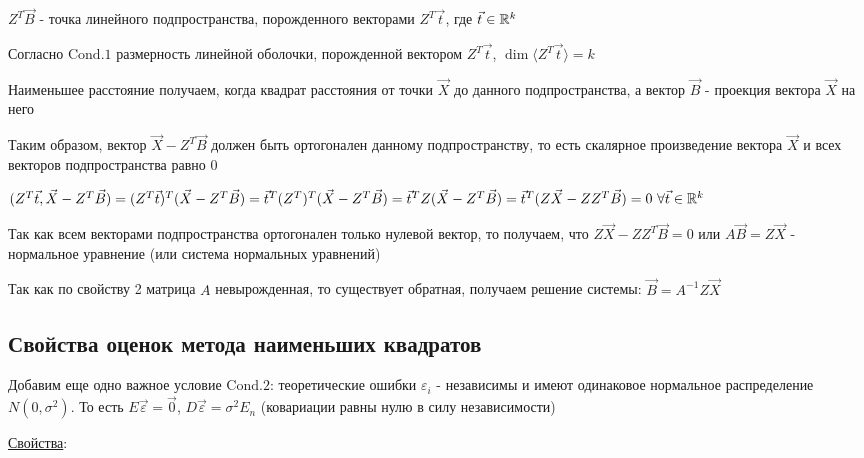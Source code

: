 \documentclass[12pt]{article}
\begin{document}
$Z^T \vec B$ - точка линейного подпространства, порожденного векторами $Z^T \vec t$, где $\vec t \in \mathbb{R}^k$

\Nota Согласно $\mathrm{Cond. 1}$ размерность линейной оболочки, порожденной вектором $Z^T \vec t$,  $\dim \langle Z^T \vec t \rangle = k$

Наименьшее расстояние получаем, когда квадрат расстояния от точки $\vec X$ до данного подпространства, а вектор $\vec B$ - проекция вектора $\vec X$ на него

Таким образом, вектор $\vec X - Z^T \vec B$ должен быть ортогонален данному подпространству, то есть скалярное произведение вектора $\vec X$ и всех векторов подпространства равно 0

$(Z^T \vec t, \vec X - Z^T \vec B) = (Z^T \vec t)^T (\vec X - Z^T \vec B) = {\vec t}^T (Z^T)^T (\vec X - Z^T \vec B) = {\vec t}^T Z (\vec X - Z^T \vec B) = 
{\vec t}^T (Z \vec X - Z Z ^T \vec B) = 0 \ \forall \vec t \in \mathbb{R}^k$

Так как всем векторами подпространства ортогонален только нулевой вектор, то получаем, что $Z \vec X - Z Z^T \vec B = 0$ или $A \vec B = Z \vec X$ - нормальное уравнение (или система нормальных уравнений)

Так как по свойству 2 матрица $A$ невырожденная, то существует обратная, получаем решение системы: $\vec B = A^{-1} Z \vec X$

\subsection{Свойства оценок метода наименьших квадратов}

Добавим еще одно важное условие $\mathrm{Cond. 2}$: теоретические ошибки $\varepsilon_i$ - независимы и имеют одинаковое нормальное распределение $N(0, \sigma^2)$.
То есть $E \vec \varepsilon = \vec 0$, $D \vec \varepsilon = \sigma^2 E_n$ (ковариации равны нулю в силу независимости)

\hypertarget{mls_evaluation_properties}{}

\underline{Свойства}:
\end{document}
